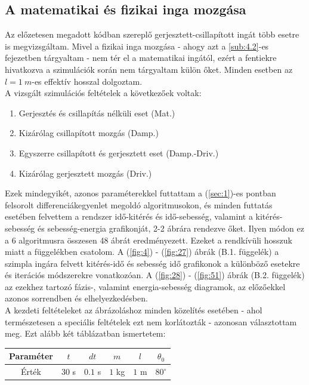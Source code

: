 \begin{multicols}{2}
\subsection{A matematikai és fizikai inga mozgása} \label{sub:4.1}
Az előzetesen megadott kódban szereplő gerjesztett-csillapított ingát több esetre is megvizsgáltam. Mivel a fizikai inga mozgása - ahogy azt a \ref{sub:4.2}-es fejezetben tárgyaltam - nem tér el a matematikai ingától, ezért a fentiekre hivatkozva a szimulációk során nem tárgyaltam külön őket. Minden esetben az $l = 1\ m$-es effektív hosszal dolgoztam. \\
A vizsgált szimulációs feltételek a következőek voltak:
\begin{enumerate}
    \item Gerjesztés és csillapítás nélküli eset (Mat.)
    \item Kizárólag csillapított mozgás (Damp.)
    \item Egyszerre csillapított és gerjesztett eset (Damp.-Driv.)
    \item Kizárólag gerjesztett mozgás (Driv.)
\end{enumerate}
Ezek mindegyikét, azonos paraméterekkel futtattam a (\ref{sec:1})-es pontban felsorolt differenciákegyenlet megoldó algoritmusokon, és minden futtatás esetében felvettem a rendszer idő-kitérés és idő-sebesség, valamint a kitérés-sebesség és sebesség-energia grafikonját, 2-2 ábrára rendezve őket. Ilyen módon ez a 6 algoritmusra összesen 48 ábrát eredményezett. Ezeket a rendkívüli hosszuk miatt a  függelékben csatolom. A (\ref{fig:4}) - (\ref{fig:27}) ábrák (B.1. függelék) a szimpla ingára felvett kitérés-idő és sebesség idő grafikonok a különböző esetekre és iterációs módszerekre vonatkozóan. A (\ref{fig:28}) - (\ref{fig:51}) ábrák (B.2. függelék) az ezekhez tartozó fázis-, valamint energia-sebesség diagramok, az előzőekkel azonos sorrendben és elhelyezkedésben.
\\
A kezdeti feltételeket az ábrázoláshoz minden közelítés esetében - ahol természetesen a speciális feltételek ezt nem korlátozták - azonosan választottam meg. Ezt alább két táblázatban ismertetem:

\begin{center}
\begin{tabular}{c||c|c|c|c|c}
    \hline
    Paraméter & $t$     & $dt$     & $m$     & $l$    & $\theta_{0}$  \\ \hline
    Érték     & $30$ s  & $0.1$ s  & $1$ kg  & $1$ m  & $80^{\circ}$  \\ \hline
\end{tabular}
\end{center}
\label{tab1}


\end{multicols}
